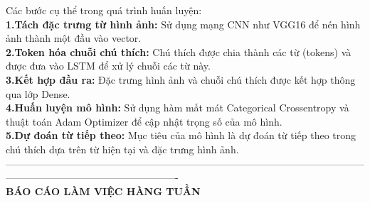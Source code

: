 \documentclass{article}
\begin{document}
Các bước cụ thể trong quá trình huấn luyện:\\
\textbf{1.Tách đặc trưng từ hình ảnh:} Sử dụng mạng CNN như VGG16 để nén hình ảnh thành một đầu vào vector.\\
\textbf{2.Token hóa chuỗi chú thích:} Chú thích được chia thành các từ (tokens) và được đưa vào LSTM để xử lý chuỗi các từ này.\\
\textbf{3.Kết hợp đầu ra:} Đặc trưng hình ảnh và chuỗi chú thích được kết hợp thông qua lớp Dense.\\
\textbf{4.Huấn luyện mô hình:} Sử dụng hàm mất mát Categorical Crossentropy và thuật toán Adam Optimizer để cập nhật trọng số của mô hình.\\
\textbf{5.Dự đoán từ tiếp theo: } Mục tiêu của mô hình là dự đoán từ tiếp theo trong chú thích dựa trên từ hiện tại và đặc trưng hình ảnh.
\\
----------------------------------------------------------------------------------------------------------------------------------------------------------------
\\
\textbf{BÁO CÁO LÀM VIỆC HÀNG TUẦN}
\end{document}

